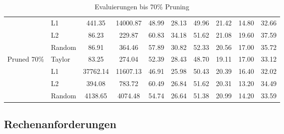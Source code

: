 \begin{table}[h]
{\begin{tabular}{l l | c c | c c c c c | r}
			                             & L1              & 441.35             & 14000.87
			                             & 48.99           & 28.13              & 49.96
			                             & 21.42           & 14.80              & 32.66            \\


			                             & L2              & 86.23              & 229.87
			                             & 60.83           & 34.18              & 51.62
			                             & 21.08           & 19.60              & 37.59            \\


			                             & Random          & 86.91              & 364.46
			                             & 57.89           & 30.82              & 52.33
			                             & 20.56           & 17.00              & 35.72            \\

			\midrule
			\multirow{4}{*}{Pruned 70\%} & Taylor          & 83.25              & 274.04
			                             & 52.39           & 28.43              & 48.70
			                             & 19.11           & 17.00              & 33.12            \\

			                             & L1              & 37762.14           & 11607.13
			                             & 46.91           & 25.98              & 50.43
			                             & 20.39           & 16.40              & 32.02            \\


			                             & L2              & 394.08             & 783.72
			                             & 60.49           & 26.84              & 51.62
			                             & 20.31           & 13.20              & 34.49            \\


			                             & Random          & 4138.65            & 4074.48
			                             & 54.74           & 26.64              & 51.38
			                             & 20.99           & 14.20              & 33.59            \\
			\bottomrule
			\bottomrule
		\end{tabular}}
	\caption{Evaluierungen bis 70\% Pruning}
	\label{tab:pruning70}
\end{table}

\newpage
\subsection{Rechenanforderungen}

